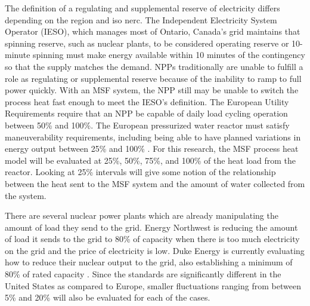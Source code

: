 The definition of a regulating and supplemental reserve of electricity differs depending on the region and \ac{iso} \ac{nerc}.  The Independent Electricity System Operator (IESO), which manages most of Ontario, Canada's grid maintains that spinning reserve, such as nuclear plants, to be considered operating reserve or 10-minute spinning must make energy available within 10 minutes of the contingency so that the supply matches the demand\cite{NERC2014}. NPPs traditionally are unable to fulfill a role as regulating or supplemental reserve because of the inability to ramp to full power quickly.  With an MSF system, the NPP still may be unable to switch the process heat fast enough to meet the IESO's definition. The European Utility Requirements require that an NPP be capable of daily load cycling operation between 50\% and 100\%. The European pressurized water reactor must satisfy maneuverability requirements, including being able to have planned variations in energy output between 25\% and 100\% \cite{NEA2011}. For this research, the MSF process heat model will be evaluated at 25\%, 50\%, 75\%, and 100\% of the heat load from the reactor. Looking at 25\% intervals will give some notion of the relationship between the heat sent to the MSF system and the amount of water collected from the system.

There are several nuclear power plants which are already manipulating the amount of load they send to the grid.  Energy Northwest is reducing the amount of load it sends to the grid to 80\% of capacity when there is too much electricity on the grid and the price of electricity is low.  Duke Energy is currently evaluating how to reduce their nuclear output to the grid, also establishing a minimum of 80\% of rated capacity \cite{siphers}.  Since the standards are significantly different in the United States as compared to Europe, smaller fluctuations ranging from between 5\% and 20\% will also be evaluated for each of the cases.

